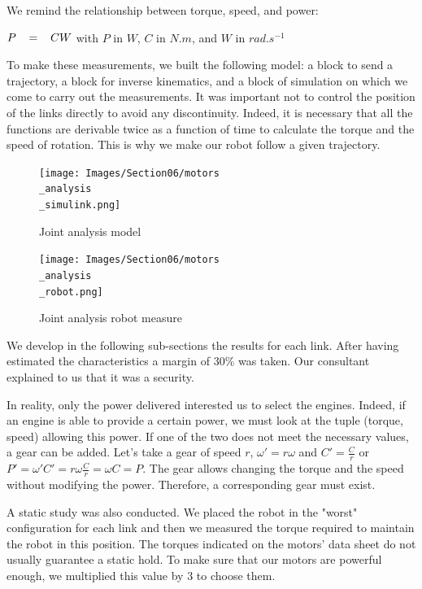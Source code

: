 We remind the relationship between torque, speed, and power: 
\begin{center}
    $P\hspace{0.3cm}=\hspace{0.3cm}CW$ with $P$ in $W$, $C$ in $N.m$, and $W$ in $rad.s^{-1}$
\end{center}

\bigbreak
To make these measurements, we built the following model: a block to send a trajectory, a block for inverse kinematics, and a block of simulation on which we come to carry out the measurements. It was important not to control the position of the links directly to avoid any discontinuity. Indeed, it is necessary that all the functions are derivable twice as a function of time to calculate the torque and the speed of rotation. This is why we make our robot follow a given trajectory.
\begin{figure}[ht]
    \centering
    \texttt{[image: Images/Section06/motors\\\_analysis\\\_simulink.png]}
    \caption{Joint analysis model}
    \label{fig:JointGlobalModel}
\end{figure}
\FloatBarrier

\begin{figure}[ht]
    \centering
    \texttt{[image: Images/Section06/motors\\\_analysis\\\_robot.png]}
    \caption{Joint analysis robot measure}
    \label{fig:JointRobotModel}
\end{figure}
\FloatBarrier

\bigbreak
We develop in the following sub-sections the results for each link. After having estimated the characteristics a margin of 30\% was taken. Our consultant explained to us that it was a security. 

\bigbreak
In reality, only the power delivered interested us to select the engines. Indeed, if an engine is able to provide a certain power, we must look at the tuple (torque, speed) allowing this power. If one of the two does not meet the necessary values, a gear can be added. Let's take a gear of speed $r$, $\omega'= r\omega$ and $C'= \frac{C}{r}$ or $P'= \omega'C'=r\omega\frac{C}{r} = \omega C = P$. The gear allows changing the torque and the speed without modifying the power. Therefore, a corresponding gear must exist.

\bigbreak
A static study was also conducted. We placed the robot in the "worst" configuration for each link and then we measured the torque required to maintain the robot in this position. The torques indicated on the motors' data sheet do not usually guarantee a static hold. To make sure that our motors are powerful enough, we multiplied this value by 3 to choose them. 

